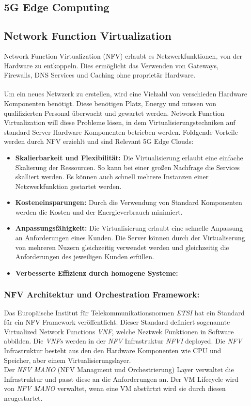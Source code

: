 \documentclass[runningheads]{llncs}
\numberwithin{figure}{section}
\begin{document}
\subsection{5G Edge Computing}
\label{subsec:5G Edge Computing}
\subsection{Network Function Virtualization}
\label{subsec:Network Function Virtualization}
Network Function Virtualization (NFV) erlaubt es Netzwerkfunktionen, von der Hardware zu entkoppeln.
Dies ermöglicht das Verwenden von Gateways, Firewalls, DNS Services und Caching ohne proprietär Hardware.
\\
\\
Um ein neues Netwzerk zu erstellen, wird eine Vielzahl von verschieden Hardware Komponenten benötigt. 
Diese benötigen Platz, Energy und müssen von qualifizierten Personal überwacht und gewartet werden. 
Network Function Virtualization will diese Probleme lösen, in dem Virtualisierungstechniken auf standard
Server Hardware Komponenten betrieben werden. 
Foldgende Vorteile werden durch NFV erziehlt und sind Relevant 5G Edge Clouds: \cite{nfv_wp}
\begin{itemize}
  \item \textbf{Skalierbarkeit und Flexibilität:} Die Virtualisierung erlaubt eine einfache Skalierung der Ressourcen.
  So kann bei einer großen Nachfrage die Services skalliert werden. Es können auch schnell mehrere Instanzen einer Netzwerkfunktion gestartet werden.
  \item \textbf{Kosteneinsparungen:} Durch die Verwendung von Standard Komponenten werden die Kosten und der Energieverbrauch minimiert.
  \item \textbf{Anpassungsfähigkeit:} Die Virtualisierung erlaubt eine schnelle Anpassung an Anforderungen eines Kunden. 
  Die Server können durch der Virtualiserung von mehreren Nuzern gleichzeitig verwendet werden und gleichzeitig die Anforderungen des jeweiligen
  Kunden erfüllen.
  \item \textbf{Verbesserte Effizienz durch homogene Systeme:}
\end{itemize}


\subsubsection{NFV Architektur und Orchestration Framework:}
Das Europäische Institut für Telekommunikationsnormen \textit{ETSI} hat ein Standard für ein NFV Framework veröffentlicht.
Dieser Standard definiert sogenannte Virtualized Network Functions \textit{VNF}, welche Neztwek Funktionen in Software abbilden.
Die \textit{VNFs} werden in der \textit{NFV} Infrastruktur \textit{NFVI} deployed. Die \textit{NFV} Infrastruktur besteht aus den
den Hardware Komponenten wie CPU und Speicher, aber einem Virtualisierungslayer. \\
Der \textit{NFV MANO} (NFV Managment und Orchestrierung) Layer verwaltet die Infrastruktur und passt diese an die Anforderungen an.
Der VM Lifecycle wird von \textit{NFV MANO} verwaltet, wenn eine VM abstürtzt wird sie durch diesen neugestartet.
\end{document}
